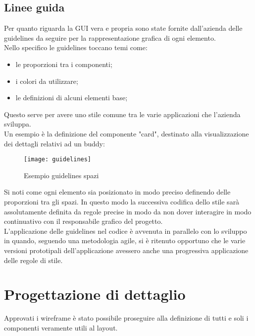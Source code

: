 \subsection{Linee guida}
Per quanto riguarda la GUI vera e propria sono state fornite dall'azienda delle 
guidelines da seguire per la rappresentazione grafica di ogni elemento. \\
Nello specifico le guidelines toccano temi come:
\begin{itemize}
	\item le proporzioni tra i componenti;
	\item i colori da utilizzare;
	\item le definizioni di alcuni elementi base;
\end{itemize}
Questo serve per avere uno stile comune tra le varie applicazioni che 
l'azienda sviluppa. \\
Un esempio è la definizione del componente "card", destinato alla 
visualizzazione dei dettagli relativi ad un buddy:
\begin{figure}[H] 
	\centering
	\texttt{[image: guidelines]}
	\caption{Esempio guidelines spazi}
\end{figure}
Si noti come ogni elemento sia posizionato in modo preciso definendo delle 
proporzioni tra gli spazi. In questo modo la successiva codifica dello stile sarà 
assolutamente definita da regole precise in modo da non dover interagire in modo 
continuativo con il responsabile grafico del progetto. \\
L'applicazione delle guidelines nel codice è avvenuta in parallelo con lo sviluppo 
in quando, seguendo una metodologia agile, si è ritenuto opportuno che le varie 
versioni prototipali dell'applicazione avessero anche una progressiva applicazione 
delle regole di stile.

\section{Progettazione di dettaglio}
Approvati i wireframe è stato possibile proseguire alla definizione di tutti 
e soli i componenti veramente utili al layout.
